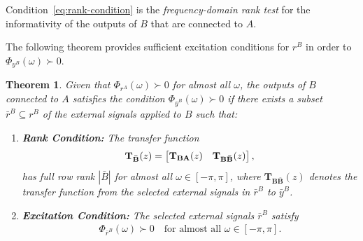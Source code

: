 \documentclass[11pt,a4paper]{article}
\newtheorem{theorem}{Theorem}
\begin{document}
Condition~\eqref{eq:rank-condition} is the \emph{frequency-domain rank test} for the informativity of the outputs of $B$ that are connected to $A$.

The following theorem provides sufficient excitation conditions for $r^B$ in order to $\Phi_{y^B}(\omega) \succ 0$.


\begin{theorem}\label{thm:minimal_excitation}
Given that $\Phi_{r^A}(\omega) \succ 0$ for almost all $\omega$, the outputs of $B$ connected to $A$ satisfies the condition $\Phi_{\bar y^B}(\omega) \succ 0$ if there exists a subset $\bar r^B \subseteq r^B$ of the external signals applied to $B$ such that:
\begin{enumerate}
    \item \textbf{Rank Condition:} The transfer function
    \begin{align}\label{eq:rank_condition}
        \mathbf{T_{\bar B}}(z) = \begin{bmatrix} \mathbf{T_{BA}}(z) & \mathbf{T_{B\bar B}}(z) \end{bmatrix},
    \end{align}
     has full row rank $|\bar B|$ for almost all $\omega \in [-\pi, \pi]$, where $\mathbf{T_{B\bar B}}(z)$ denotes the transfer function from the selected external signals in $\bar r^B$ to $\bar y^B$.
    
    \item \textbf{Excitation Condition:} The selected external signals $\bar r^B$ satisfy
    \begin{align}\label{eq:excitation_condition}
        \Phi_{\bar r^B}(\omega) \succ 0 \quad \text{for almost all } \omega \in [-\pi, \pi].
    \end{align}
\end{enumerate}
\end{theorem}
\end{document}
